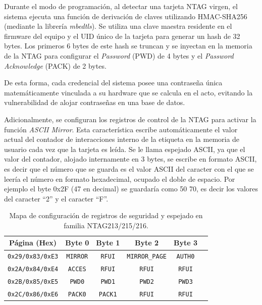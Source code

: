 Durante el modo de programación, al detectar una tarjeta NTAG virgen, el sistema ejecuta una función de derivación de claves utilizando HMAC-SHA256 (mediante la librería \textit{mbedtls}). Se utiliza una clave maestra residente en el firmware del equipo y el UID único de la tarjeta para generar un hash de 32 bytes. Los primeros 6 bytes de este hash se truncan y se inyectan en la memoria de la NTAG para configurar el \textit{Password} (PWD) de 4 bytes y el \textit{Password Acknowledge} (PACK) de 2 bytes. 

De esta forma, cada credencial del sistema posee una contraseña única matemáticamente vinculada a su hardware que se calcula en el acto, evitando la vulnerabilidad de alojar contraseñas en una base de datos.

Adicionalmente, se configuran los registros de control de la NTAG para activar la función \textit{ASCII Mirror}. Esta característica escribe automáticamente el valor actual del contador de interacciones interno de la etiqueta en la memoria de usuario cada vez que la tarjeta es leída. Se le llama espejado ASCII, ya que el valor del contador, alojado internamente en 3 bytes, se escribe en formato ASCII, es decir que el número que se guarda es el valor ASCII del caracter con el que se leería el número en formato hexadecimal, ocupado el doble de espacio. Por ejemplo el byte 0x2F (47 en decimal) se guardaría como 50 70, es decir los valores del caracter \enquote{2} y el caracter \enquote{F}.

\begin{table}[H]
    \centering
    \begin{tabular}{@{}c c c c c c@{}}
        \toprule
        \textbf{Página (Hex)} & \textbf{Byte 0} & \textbf{Byte 1} & \textbf{Byte 2} & \textbf{Byte 3}  \\
        \midrule
        \texttt{0x29/0x83/0xE3} & \texttt{MIRROR} & \texttt{RFUI} & \texttt{MIRROR\_PAGE} & \texttt{AUTH0}  \\
        \texttt{0x2A/0x84/0xE4} & \texttt{ACCES}  & \texttt{RFUI} & \texttt{RFUI} & \texttt{RFUI}  \\
        \texttt{0x2B/0x85/0xE5} & \texttt{PWD0}   & \texttt{PWD1} & \texttt{PWD2} & \texttt{PWD3}  \\
        \texttt{0x2C/0x86/0xE6} & \texttt{PACK0}  & \texttt{PACK1}& \texttt{RFUI} & \texttt{RFUI}  \\
        \bottomrule
    \end{tabular}
    \caption{Mapa de configuración de registros de seguridad y espejado en familia NTAG213/215/216.}
    \label{tab:ntag_registers}
\end{table}

